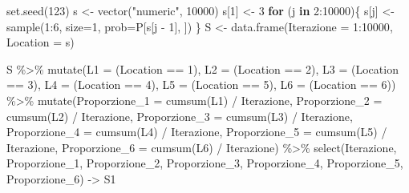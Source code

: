 \documentclass[
]{memoir}
\newenvironment{Shaded}{\begin{snugshade}}{\end{snugshade}}
\newcommand{\AttributeTok}[1]{\textcolor[rgb]{0.77,0.63,0.00}{#1}}
\newcommand{\ControlFlowTok}[1]{\textcolor[rgb]{0.13,0.29,0.53}{\textbf{#1}}}
\newcommand{\DecValTok}[1]{\textcolor[rgb]{0.00,0.00,0.81}{#1}}
\newcommand{\FunctionTok}[1]{\textcolor[rgb]{0.00,0.00,0.00}{#1}}
\newcommand{\NormalTok}[1]{#1}
\newcommand{\OtherTok}[1]{\textcolor[rgb]{0.56,0.35,0.01}{#1}}
\newcommand{\SpecialCharTok}[1]{\textcolor[rgb]{0.00,0.00,0.00}{#1}}
\newcommand{\StringTok}[1]{\textcolor[rgb]{0.31,0.60,0.02}{#1}}
\begin{document}
\begin{Shaded}
\begin{Highlighting}[]
\FunctionTok{set.seed}\NormalTok{(}\DecValTok{123}\NormalTok{)}
\NormalTok{s }\OtherTok{\textless{}{-}} \FunctionTok{vector}\NormalTok{(}\StringTok{"numeric"}\NormalTok{, }\DecValTok{10000}\NormalTok{)}
\NormalTok{s[}\DecValTok{1}\NormalTok{] }\OtherTok{\textless{}{-}} \DecValTok{3}
\ControlFlowTok{for}\NormalTok{ (j }\ControlFlowTok{in} \DecValTok{2}\SpecialCharTok{:}\DecValTok{10000}\NormalTok{)\{}
\NormalTok{  s[j] }\OtherTok{\textless{}{-}} \FunctionTok{sample}\NormalTok{(}\DecValTok{1}\SpecialCharTok{:}\DecValTok{6}\NormalTok{, }\AttributeTok{size=}\DecValTok{1}\NormalTok{, }\AttributeTok{prob=}\NormalTok{P[s[j }\SpecialCharTok{{-}} \DecValTok{1}\NormalTok{], ])}
\NormalTok{\}}
\NormalTok{S }\OtherTok{\textless{}{-}} \FunctionTok{data.frame}\NormalTok{(}\AttributeTok{Iterazione =} \DecValTok{1}\SpecialCharTok{:}\DecValTok{10000}\NormalTok{,}
                \AttributeTok{Location =}\NormalTok{ s)}

\NormalTok{S }\SpecialCharTok{\%\textgreater{}\%} \FunctionTok{mutate}\NormalTok{(}\AttributeTok{L1 =}\NormalTok{ (Location }\SpecialCharTok{==} \DecValTok{1}\NormalTok{),}
             \AttributeTok{L2 =}\NormalTok{ (Location }\SpecialCharTok{==} \DecValTok{2}\NormalTok{),}
             \AttributeTok{L3 =}\NormalTok{ (Location }\SpecialCharTok{==} \DecValTok{3}\NormalTok{),}
             \AttributeTok{L4 =}\NormalTok{ (Location }\SpecialCharTok{==} \DecValTok{4}\NormalTok{),}
             \AttributeTok{L5 =}\NormalTok{ (Location }\SpecialCharTok{==} \DecValTok{5}\NormalTok{),}
             \AttributeTok{L6 =}\NormalTok{ (Location }\SpecialCharTok{==} \DecValTok{6}\NormalTok{))  }\SpecialCharTok{\%\textgreater{}\%}
  \FunctionTok{mutate}\NormalTok{(}\AttributeTok{Proporzione\_1 =} \FunctionTok{cumsum}\NormalTok{(L1) }\SpecialCharTok{/}\NormalTok{ Iterazione,}
         \AttributeTok{Proporzione\_2 =} \FunctionTok{cumsum}\NormalTok{(L2) }\SpecialCharTok{/}\NormalTok{ Iterazione,}
         \AttributeTok{Proporzione\_3 =} \FunctionTok{cumsum}\NormalTok{(L3) }\SpecialCharTok{/}\NormalTok{ Iterazione,}
         \AttributeTok{Proporzione\_4 =} \FunctionTok{cumsum}\NormalTok{(L4) }\SpecialCharTok{/}\NormalTok{ Iterazione,}
         \AttributeTok{Proporzione\_5 =} \FunctionTok{cumsum}\NormalTok{(L5) }\SpecialCharTok{/}\NormalTok{ Iterazione,}
         \AttributeTok{Proporzione\_6 =} \FunctionTok{cumsum}\NormalTok{(L6) }\SpecialCharTok{/}\NormalTok{ Iterazione) }\SpecialCharTok{\%\textgreater{}\%}
  \FunctionTok{select}\NormalTok{(Iterazione, Proporzione\_1, Proporzione\_2, Proporzione\_3,}
\NormalTok{         Proporzione\_4, Proporzione\_5, Proporzione\_6) }\OtherTok{{-}\textgreater{}}\NormalTok{ S1}


\end{Highlighting}
\end{Shaded}
\end{document}

